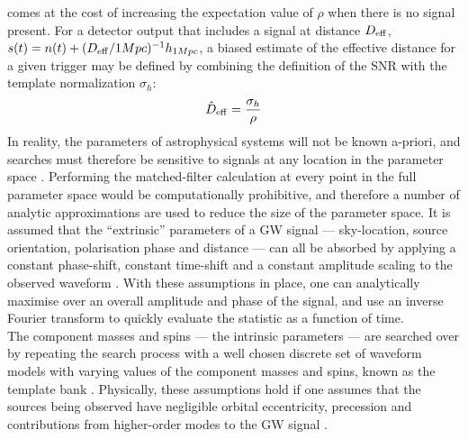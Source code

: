 \documentclass[binding=0.6cm, LaM]{sapthesis}
\begin{document}
	comes at the cost of increasing the expectation value of $\rho$ when there is no signal present. 
	For a detector output that includes a signal at distance $D_{\rm eff}$, 
	$s(t) = n(t) + (D_{\rm eff}/1 Mpc)^{-1}h_{1Mpc}$, 
	a biased estimate of the effective distance for a given trigger 
	may be defined by combining the definition of the SNR with the template normalization $\sigma_h$:
		\begin{equation}
			\hat D_{\rm eff} = {{\sigma_h} \over {\rho}}
		\end{equation}
	In reality, the parameters of astrophysical systems will not be known a-priori, 
	and searches must therefore be sensitive to signals at any location in the parameter space \cite{25}. 
	Performing the matched-filter calculation at every point in the full parameter space 
	would be computationally prohibitive, 
	and therefore a number of analytic approximations are used to reduce the size of the parameter space. 
	It is assumed that the ``extrinsic'' parameters of a GW signal --- 
	sky-location, source orientation, polarisation phase and distance --- 
	can all be absorbed by applying a constant phase-shift, 
	constant time-shift and a constant amplitude scaling to the observed waveform \cite{27}. 
	With these assumptions in place, 
	one can analytically maximise over an overall amplitude and phase of the signal, 
	and use an inverse Fourier transform to quickly evaluate the statistic as a function of time. \\
	The component masses and spins --- the intrinsic parameters --- 
	are searched over by repeating the search process with a well chosen discrete set of waveform models 
	with varying values of the component masses and spins, 
	known as the template bank \cite{27}. 
	Physically, these assumptions hold if one assumes that the sources being observed 
	have negligible orbital eccentricity, precession and contributions from higher-order modes 
	to the GW signal \cite{23}. 
\end{document}
